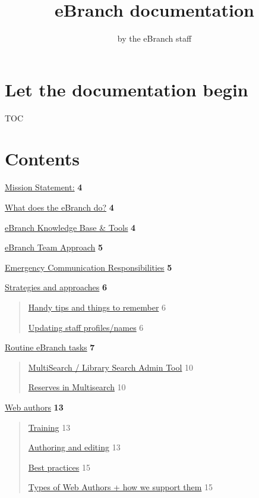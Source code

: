 \documentclass[
  openany]{book}
\title{eBranch documentation}
\author{by the eBranch staff}
\date{}
\begin{document}
\maketitle

{
\setcounter{tocdepth}{1}
\tableofcontents
}
\hypertarget{let-the-documentation-begin}{%
\chapter{Let the documentation begin}\label{let-the-documentation-begin}}

TOC

\hypertarget{contents}{%
\chapter{Contents}\label{contents}}

\protect\hyperlink{mission-statement}{Mission Statement:} \textbf{4}

\protect\hyperlink{what-does-the-ebranch-do}{What does the eBranch do?} \textbf{4}

\protect\hyperlink{ebranch-knowledge-base-tools}{eBranch Knowledge Base \& Tools} \textbf{4}

\protect\hyperlink{ebranch-team-approach}{eBranch Team Approach} \textbf{5}

\protect\hyperlink{emergency-communication-responsibilities}{Emergency Communication
Responsibilities} \textbf{5}

\protect\hyperlink{strategies-and-approaches}{Strategies and approaches} \textbf{6}

\begin{quote}
\protect\hyperlink{handy-tips-and-things-to-remember}{Handy tips and things to
remember} 6

\protect\hyperlink{updating-staff-profilesnames}{Updating staff profiles/names} 6
\end{quote}

\protect\hyperlink{routine-ebranch-tasks}{Routine eBranch tasks} \textbf{7}

\begin{quote}
\protect\hyperlink{multisearch-library-search-admin-tool}{MultiSearch / Library Search Admin
Tool} 10

\protect\hyperlink{reserves-in-multisearch}{Reserves in Multisearch} 10
\end{quote}

\protect\hyperlink{web-authors}{Web authors} \textbf{13}

\begin{quote}
\protect\hyperlink{training}{Training} 13

\protect\hyperlink{authoring-and-editing}{Authoring and editing} 13

\protect\hyperlink{best-practices}{Best practices} 15

\protect\hyperlink{types-of-web-authors-how-we-support-them}{Types of Web Authors + how we support
them} 15
\end{quote}
\end{document}
